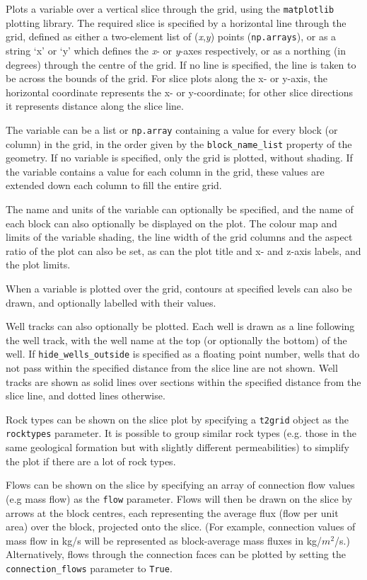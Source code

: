 Plots a variable over a vertical slice through the grid, using the \texttt{matplotlib} plotting library.  The required slice is specified by a horizontal line through the grid, defined as either a two-element list of (\emph{x},\emph{y}) points (\texttt{np.arrays}), or as a string `x' or `y' which defines the \emph{x}- or \emph{y}-axes respectively, or as a northing (in degrees) through the centre of the grid.  If no line is specified, the line is taken to be across the bounds of the grid.  For slice plots along the x- or y-axis, the horizontal coordinate represents the x- or y-coordinate; for other slice directions it represents distance along the slice line.

The variable can be a list or \texttt{np.array} containing a value for every block (or column) in the grid, in the order given by the \texttt{block\_name\_list} property of the geometry.  If no variable is specified, only the grid is plotted, without shading.  If the variable contains a value for each column in the grid, these values are extended down each column to fill the entire grid.

The name and units of the variable can optionally be specified, and the name of each block can also optionally be displayed on the plot.  The colour map and limits of the variable shading, the line width of the grid columns and the aspect ratio of the plot can also be set, as can the plot title and x- and z-axis labels, and the plot limits.

When a variable is plotted over the grid, contours at specified levels can also be drawn, and optionally labelled with their values.

Well tracks can also optionally be plotted.  Each well is drawn as a line following the well track, with the well name at the top (or optionally the bottom) of the well.  If \texttt{hide\_wells\_outside} is specified as a floating point number, wells that do not pass within the specified distance from the slice line are not shown.  Well tracks are shown as solid lines over sections within the specified distance from the slice line, and dotted lines otherwise.

Rock types can be shown on the slice plot by specifying a \texttt{t2grid} object as the \texttt{rocktypes} parameter.  It is possible to group similar rock types (e.g. those in the same geological formation but with slightly different permeabilities) to simplify the plot if there are a lot of rock types.

Flows can be shown on the slice by specifying an array of connection flow values (e.g mass flow) as the \texttt{flow} parameter.  Flows will then be drawn on the slice by arrows at the block centres, each representing the average flux (flow per unit area) over the block, projected onto the slice.  (For example, connection values of mass flow in kg/s will be represented as block-average mass fluxes in kg/$m^2$/s.)  Alternatively, flows through the connection faces can be plotted by setting the \texttt{connection\_flows} parameter to \texttt{True}.

